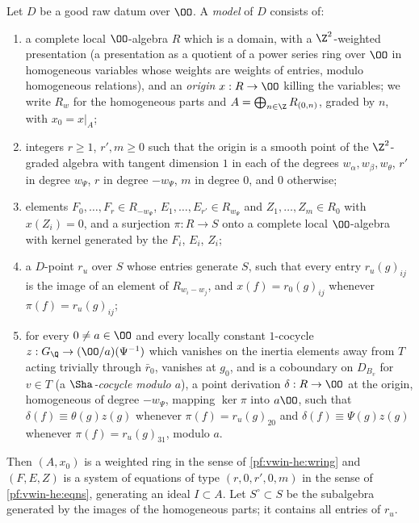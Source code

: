 \begin{definition}[Models]\label{pf:modularity:model}
Let $D$ be a good raw datum over $\OO$. A \emph{model} of $D$ consists of:
\begin{enumerate}[label=(\alph*)]
\item a complete local $\OO$-algebra $R$ which is a domain, with a $\Z^2$-weighted presentation (a presentation as a
quotient of a power series ring over $\OO$ in homogeneous variables whose weights are weights of entries, modulo
homogeneous relations), and an \emph{origin} $x:R\to\OO$ killing the variables; we write $R_w$ for the homogeneous
parts and $A=\bigoplus_{n\in\Z}R_{(0,n)}$, graded by $n$, with $x_0=x|_A$;
\item integers $r\ge1$, $r',m\ge0$ such that the origin is a smooth point of the $\Z^2$-graded algebra with tangent
dimension $1$ in each of the degrees $w_\alpha,w_\beta,w_\theta$, $r'$ in degree $w_\Psi$, $r$ in degree $-w_\Psi$, $m$
in degree $0$, and $0$ otherwise;
\item elements $F_0,\dots,F_r\in R_{-w_\Psi}$, $E_1,\dots,E_{r'}\in R_{w_\Psi}$ and $Z_1,\dots,Z_m\in R_0$ with
$x(Z_i)=0$, and a surjection $\pi:R\to S$ onto a complete local $\OO$-algebra with kernel generated by the $F_i$, $E_i$,
$Z_i$;
\item a $D$-point $r_u$ over $S$ whose entries generate $S$, such that every entry $r_u(g)_{ij}$ is the image of an
element of $R_{w_i-w_j}$, and $x(f)=r_0(g)_{ij}$ whenever $\pi(f)=r_u(g)_{ij}$;
\item for every $0\ne a\in\OO$ and every locally constant $1$-cocycle $z:G_\Q\to(\OO/a)(\Psi^{-1})$ which vanishes on
the inertia elements away from $T$ acting trivially through $\bar r_0$, vanishes at $g_0$, and is a coboundary on
$D_{B_v}$ for $v\in T$ (a \emph{$\Sha$-cocycle modulo $a$}), a point derivation $\delta:R\to\OO$ at the origin,
homogeneous of degree $-w_\Psi$, mapping $\ker\pi$ into $a\OO$, such that $\delta(f)\equiv\theta(g)z(g)$ whenever
$\pi(f)=r_u(g)_{20}$ and $\delta(f)\equiv\Psi(g)z(g)$ whenever $\pi(f)=r_u(g)_{31}$, modulo $a$.
\end{enumerate}
Then $(A,x_0)$ is a weighted ring in the sense of \cref{pf:vwin-he:wring} and $(F,E,Z)$ is a system of equations of type
$(r,0,r',0,m)$ in the sense of \cref{pf:vwin-he:eqns}, generating an ideal $I\subset A$. Let $S^\circ\subset S$ be the
subalgebra generated by the images of the homogeneous parts; it contains all entries of $r_u$.
\end{definition}

